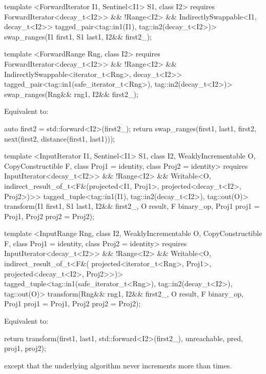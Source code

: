 \begin{codeblock}
template <ForwardIterator I1, Sentinel<I1> S1, class I2>
  requires ForwardIterator<decay_t<I2>> && !Range<I2> &&
    IndirectlySwappable<I1, decay_t<I2>>
  tagged_pair<tag::in1(I1), tag::in2(decay_t<I2>)>
    swap_ranges(I1 first1, S1 last1, I2&& first2_);

template <ForwardRange Rng, class I2>
  requires ForwardIterator<decay_t<I2>> && !Range<I2> &&
    IndirectlySwappable<iterator_t<Rng>, decay_t<I2>>
  tagged_pair<tag::in1(safe_iterator_t<Rng>), tag::in2(decay_t<I2>)>
    swap_ranges(Rng&& rng1, I2&& first2_);
\end{codeblock}

\pnum
\effects
Equivalent to:
\begin{codeblock}
  auto first2 = std::forward<I2>(first2_);
  return swap_ranges(first1, last1, first2, next(first2, distance(first1, last1)));
\end{codeblock}

\begin{codeblock}
template <InputIterator I1, Sentinel<I1> S1, class I2, WeaklyIncrementable O,
    CopyConstructible F, class Proj1 = identity, class Proj2 = identity>
  requires InputIterator<decay_t<I2>> && !Range<I2> &&
    Writable<O, indirect_result_of_t<F&(projected<I1, Proj1>,
        projected<decay_t<I2>, Proj2>)>>
  tagged_tuple<tag::in1(I1), tag::in2(decay_t<I2>), tag::out(O)>
    transform(I1 first1, S1 last1, I2&& first2_, O result,
              F binary_op, Proj1 proj1 = Proj1{}, Proj2 proj2 = Proj2{});

template <InputRange Rng, class I2, WeaklyIncrementable O, CopyConstructible F,
    class Proj1 = identity, class Proj2 = identity>
  requires InputIterator<decay_t<I2>> && !Range<I2> &&
    Writable<O, indirect_result_of_t<F&(
        projected<iterator_t<Rng>, Proj1>, projected<decay_t<I2>, Proj2>>)>
  tagged_tuple<tag::in1(safe_iterator_t<Rng>), tag::in2(decay_t<I2>), tag::out(O)>
    transform(Rng&& rng1, I2&& first2_, O result,
              F binary_op, Proj1 proj1 = Proj1{}, Proj2 proj2 = Proj2{});
\end{codeblock}

\pnum
\effects
Equivalent to:
\begin{codeblock}
return transform(first1, last1, std::forward<I2>(first2_), unreachable{}, pred, proj1, proj2);
\end{codeblock}
except that the underlying algorithm never increments  more than  times.
